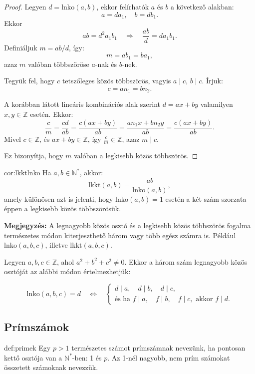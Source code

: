 \begin{proof}
Legyen $d=\mathrm{lnko}(a,b)$, ekkor felírhatók $a$ és $b$ a következő
alakban: 
\[
a=da_{1},\quad b=db_{1}.
\]
Ekkor 
\[
ab=d^{2}a_{1}b_{1}\quad\Rightarrow\quad\frac{ab}{d}=da_{1}b_{1}.
\]
Definiáljuk $m=ab/d$, így: 
\[
m=ab_{1}=ba_{1},
\]
azaz $m$ valóban többszöröse $a$-nak és $b$-nek.

Tegyük fel, hogy $c$ tetszőleges közös többszörös, vagyis $a\mid c$,
$b\mid c$. Írjuk: 
\[
c=an_{1}=bn_{2}.
\]

A korábban látott lineáris kombinációs alak szerint $d=ax+by$ valamilyen
$x,y\in\mathbb{Z}$ esetén. Ekkor: 
\[
\frac{c}{m}=\frac{cd}{ab}=\frac{c(ax+by)}{ab}=\frac{an_{1}x+bn_{2}y}{ab}=\frac{c(ax+by)}{ab}.
\]
Mivel $c\in\mathbb{Z}$, és $ax+by\in\mathbb{Z}$, így $\frac{c}{m}\in\mathbb{Z}$,
azaz $m\mid c$.

Ez bizonyítja, hogy $m$ valóban a legkisebb közös többszörös.
\end{proof}
\begin{corollary}{cor:lkktlnko}
Ha $a,b\in\mathbb{N}^{*}$, akkor: 
\[
\mathrm{lkkt}(a,b)=\frac{ab}{\mathrm{lnko}(a,b)},
\]
amely különösen azt is jelenti, hogy $\mathrm{lnko}(a,b)=1$ esetén
a két szám szorzata éppen a legkisebb közös többszörösük.
\end{corollary}

\textbf{Megjegyzés:} A legnagyobb közös osztó és a legkisebb közös
többszörös fogalma természetes módon kiterjeszthető három vagy több
egész számra is. Például $\mathrm{lnko}(a,b,c)$, illetve $\mathrm{lkkt}(a,b,c)$.

Legyen $a,b,c\in\mathbb{Z}$, ahol $a^{2}+b^{2}+c^{2}\neq0$. Ekkor
a három szám legnagyobb közös osztóját az alábbi módon értelmezhetjük:

\[
\mathrm{lnko}(a,b,c)=d\quad\Longleftrightarrow\quad\begin{cases}
d\mid a,\quad d\mid b,\quad d\mid c,\\
\text{és ha }f\mid a,\quad f\mid b,\quad f\mid c,\text{ akkor }f\mid d.
\end{cases}
\]


\subsection*{Prímszámok}
\begin{definition}{def:primek}
Egy $p>1$ természetes számot prímszámnak nevezünk, ha pontosan kettő
osztója van a $\mathbb{N}^{*}$-ben: 1 és $p$. Az 1-nél nagyobb,
nem prím számokat összetett számoknak nevezzük.
\end{definition}

